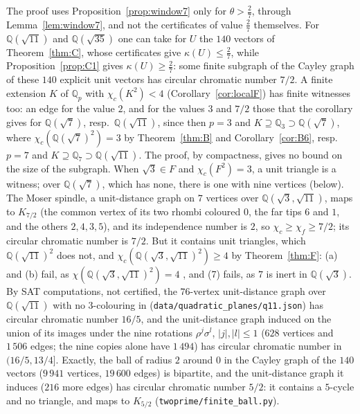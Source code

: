 \documentclass[11pt,a4paper]{amsart}
\theoremstyle{remark}
\newcommand{\Q}{\mathbb{Q}}
\begin{document}
The proof uses Proposition~\ref{prop:window7} only for $\theta>\frac27$, through Lemma~\ref{lem:window7}, and
not the certificates of value $\frac27$ themselves. For $\Q(\sqrt{11})$ and $\Q(\sqrt{35})$ one can take for $U$ the $140$ vectors of
Theorem~\ref{thm:C}, whose certificates give $\kappa(U)\le\frac27$, while Proposition~\ref{prop:C1} gives
$\kappa(U)\ge\frac27$: some finite subgraph of the Cayley graph of these $140$ explicit unit vectors has circular
chromatic number $7/2$. A finite extension $K$ of $\Q_p$ with $\chi_c(K^2)<4$ (Corollary~\ref{cor:localF}) has
finite witnesses too: an edge for the value $2$, and for the values $3$ and $7/2$ those that the corollary gives for
$\Q(\sqrt7)$, resp.\ $\Q(\sqrt{11})$, since then $p=3$ and $K\supseteq\Q_3\supset\Q(\sqrt7)$, where
$\chi_c(\Q(\sqrt7)^2)=3$ by Theorem~\ref{thm:B} and Corollary~\ref{cor:B6}, resp.\ $p=7$ and
$K\supseteq\Q_7\supset\Q(\sqrt{11})$. The proof, by compactness, gives no
bound on the size of the subgraph. When $\sqrt3\in F$ and $\chi_c(F^2)=3$, a unit triangle is a witness; over
$\Q(\sqrt7)$, which has none, there is one with nine vertices (below). The Moser
spindle, a unit-distance graph on $7$ vertices over $\Q(\sqrt3,\sqrt{11})$, maps to $K_{7/2}$ (the common vertex of
its two rhombi coloured $0$, the far tips $6$ and $1$, and the others $2,4,3,5$), and its independence number is
$2$, so $\chi_c\ge\chi_f\ge7/2$; its circular chromatic number is $7/2$. But it contains unit triangles, which
$\Q(\sqrt{11})^2$ does not, and $\chi_c(\Q(\sqrt3,\sqrt{11})^2)\ge4$ by Theorem~\ref{thm:F}: (a) and (b) fail, as
$\chi(\Q(\sqrt3,\sqrt{11})^2)=4$ \cite{Fischer1994,MM}, and (7) fails, as $7$ is inert in $\Q(\sqrt3)$. By SAT
computations, not certified, the $76$-vertex unit-distance graph over $\Q(\sqrt{11})$ with no $3$-colouring in
\cite{Repo} (\nolinkurl{data/quadratic_planes/q11.json}) has circular chromatic number $16/5$, and the unit-distance graph
induced on the union of its images under the nine rotations $\rho^j\sigma^l$, $|j|,|l|\le1$ ($628$ vertices and
$1\,506$ edges; the nine copies alone have $1\,494$) has circular chromatic number in $(16/5,13/4]$. Exactly, the ball of radius
$2$ around $0$ in the Cayley graph of the $140$ vectors ($9\,941$ vertices, $19\,600$ edges) is bipartite, and the
unit-distance graph it induces ($216$ more edges) has circular chromatic number $5/2$: it contains a $5$-cycle and no
triangle, and maps to $K_{5/2}$ (\nolinkurl{twoprime/finite_ball.py}).
\end{document}
